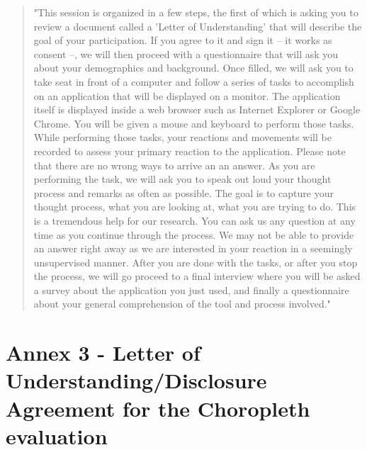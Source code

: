\documentclass[twocolumn, letterpaper,13pt]{scrartcl}
\begin{document}
    \begin{quote}
        "This session is organized in a few steps, the first of which is asking you to review a document called a 'Letter of Understanding' that will describe the goal of your participation. If you agree to it and sign it -- it works as consent --, we will then proceed with a questionnaire that will ask you about your demographics and background. Once filled, we will ask you to take seat in front of a computer and follow a series of tasks to accomplish on an application that will be displayed on a monitor. The application itself is displayed inside a web browser such as Internet Explorer or Google Chrome. You will be given a mouse and keyboard to perform those tasks. 
        \newline\newline
        While performing those tasks, your reactions and movements will be recorded to assess your primary reaction to the application. Please note that there are no wrong ways to arrive an an answer. As you are performing the task, we will ask you to speak out loud your thought process and remarks as often as possible. The goal is to capture your thought process, what you are looking at, what you are trying to do. This is a tremendous help for our research.
        \newline\newline
        You can ask us any question at any time as you continue through the process. We may not be able to provide an answer right away as we are interested in your reaction in a seemingly unsupervised manner.
        \newline\newline
        After you are done with the tasks, or after you stop the process, we will go proceed to a final interview where you will be asked a survey about the application you just used, and finally a questionnaire about your general comprehension of the tool and process involved."
    \end{quote}
    
    \section*{Annex 3 - Letter of Understanding/Disclosure Agreement for the Choropleth evaluation}
    
\end{document}
